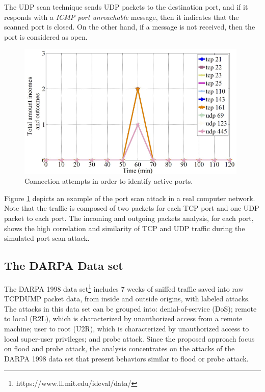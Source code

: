 The UDP scan technique sends UDP packets to the destination port, and if it responds with a \emph{ICMP port unreachable} message, then it indicates that the scanned port is closed. On the other hand, if a message is not received, then the port is considered as open.

\begin{figure}[h!]
     \centering 
     \includegraphics[width=11cm]{figures/ch2/fig07.png}
     \caption{Connection attempts in order to identify active ports.}
     \label{fig:2.07}
\end{figure}

Figure \ref{fig:2.07} depicts an example of the port scan attack in a real computer network. Note that the traffic is composed of two packets for each TCP port and one UDP packet to each port. The incoming and outgoing packets analysis, for each port, shows the high correlation and similarity of TCP and UDP traffic during the simulated port scan attack.

\subsection{The DARPA Data set}
\label{sec:2_Darpadata set}

The DARPA 1998 data set\footnote{https://www.ll.mit.edu/ideval/data/} includes 7 weeks of sniffed traffic saved into raw TCPDUMP packet data, from inside and outside origins, with labeled attacks. The attacks in this data set can be grouped into: denial-of-service (DoS); remote to local (R2L), which is characterized by unauthorized access from a remote machine; user to root (U2R), which is characterized by unauthorized access to local super-user privileges; and probe attack. Since the proposed approach focus on flood and probe attack, the analysis concentrates on the attacks of the DARPA 1998 data set that present behaviors similar to flood or probe attack. 

